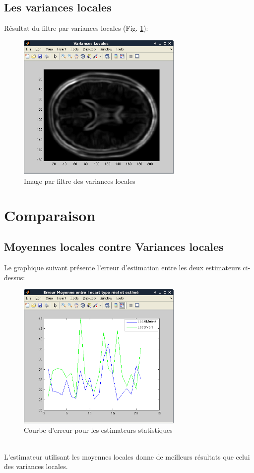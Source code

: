 \documentclass{report}
\begin{document}
\subsection{Les variances locales}
Résultat du filtre par variances locales (Fig. \ref{fig:lv}):

\begin{figure}[!ht]
	\centering
	\includegraphics[width = 8cm]{varianceLocal.png}
	\caption{\label{fig:lv}Image par filtre des variances locales}
\end{figure}

\section{Comparaison}
\subsection{Moyennes locales contre Variances locales}
Le graphique suivant présente l'erreur d'estimation entre les deux estimateurs ci-dessus:
\begin{figure}[!ht]
	\centering
	\includegraphics[width = 8cm]{erreurStat.png}
	\caption{\label{fig:errstat}Courbe d'erreur pour les estimateurs statistiques}
\end{figure}
~\\
L'estimateur utilisant les moyennes locales donne de meilleurs résultats que celui des variances locales.
\end{document}
